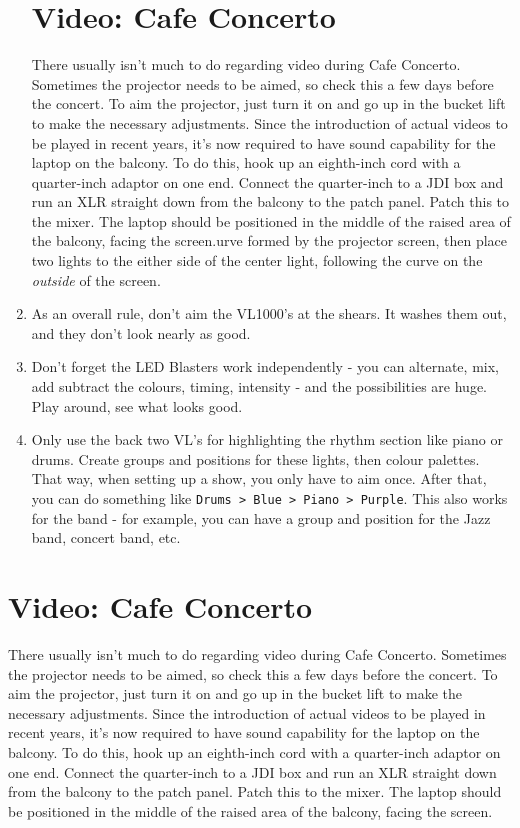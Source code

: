\documentclass[11pt,a4paper]{book}
\begin{document}
\begin{enumerate}
\section{Video: Cafe Concerto}
There usually isn't much to do regarding video during Cafe Concerto. Sometimes the projector needs to be aimed, so check this a few days before the concert. To aim the projector, just turn it on and go up in the bucket lift to make the necessary adjustments. Since the introduction of actual videos to be played in recent years, it's now required to have sound capability for the laptop on the balcony. To do this, hook up an eighth-inch cord with a quarter-inch adaptor on one end. Connect the quarter-inch to a JDI box and run an XLR straight down from the balcony to the patch panel. Patch this to the mixer. The laptop should be positioned in the middle of the raised area of the balcony, facing the screen.urve formed by the projector screen, then place two lights to the either side of the center light, following the curve on the \textit{outside} of the screen.
\item As an overall rule, don't aim the VL1000's at the shears. It washes them out, and they don't look nearly as good.
\item Don't forget the LED Blasters work independently - you can alternate, mix, add subtract the colours, timing, intensity - and the possibilities are huge. Play around, see what looks good. 
\item Only use the back two VL's for highlighting the rhythm section like piano or drums. Create groups and positions for these lights, then colour palettes. That way, when setting up a show, you only have to aim once. After that, you can do something like \texttt{Drums > Blue > Piano > Purple}. This also works for the band - for example, you can have a group and position for the Jazz band, concert band, etc.
\end{enumerate}
\section{Video: Cafe Concerto}
There usually isn't much to do regarding video during Cafe Concerto. Sometimes the projector needs to be aimed, so check this a few days before the concert. To aim the projector, just turn it on and go up in the bucket lift to make the necessary adjustments. Since the introduction of actual videos to be played in recent years, it's now required to have sound capability for the laptop on the balcony. To do this, hook up an eighth-inch cord with a quarter-inch adaptor on one end. Connect the quarter-inch to a JDI box and run an XLR straight down from the balcony to the patch panel. Patch this to the mixer. The laptop should be positioned in the middle of the raised area of the balcony, facing the screen.
\end{document}
